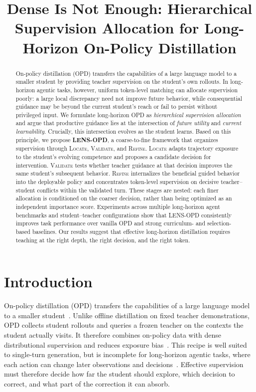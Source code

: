 \documentclass{article}
\title{Dense Is Not Enough: Hierarchical Supervision Allocation for Long-Horizon On-Policy Distillation}
\author{}
\begin{document}
\maketitle

\begin{abstract}
On-policy distillation (OPD) transfers the capabilities of a large language model to a smaller student by providing teacher supervision on the student's own rollouts.  In long-horizon agentic tasks, however, uniform token-level matching can allocate supervision poorly: a large local discrepancy need not improve future behavior, while consequential guidance may be beyond the current student's reach or fail to persist without privileged input.  We formulate long-horizon OPD as \emph{hierarchical supervision allocation} and argue that productive guidance lies at the intersection of \emph{future utility} and \emph{current learnability}.  Crucially, this intersection evolves as the student learns.  Based on this principle, we propose \textbf{LENS-OPD}, a coarse-to-fine framework that organizes supervision through \textsc{Locate}, \textsc{Validate}, and \textsc{Refine}.  \textsc{Locate} adapts trajectory exposure to the student's evolving competence and proposes a candidate decision for intervention.  \textsc{Validate} tests whether teacher guidance at that decision improves the same student's subsequent behavior.  \textsc{Refine} internalizes the beneficial guided behavior into the deployable policy and concentrates token-level supervision on decisive teacher--student conflicts within the validated turn.  These stages are nested: each finer allocation is conditioned on the coarser decision, rather than being optimized as an independent importance score.  Experiments across multiple long-horizon agent benchmarks and student--teacher configurations show that LENS-OPD consistently improves task performance over vanilla OPD and strong curriculum- and selection-based baselines.  Our results suggest that effective long-horizon distillation requires teaching at the right depth, the right decision, and the right token.
\end{abstract}

\section{Introduction}
\label{sec:introduction}

On-policy distillation (OPD) transfers the capabilities of a large language model to a smaller
student~\citep{gu2023minillm,agarwal2024policy}.  Unlike offline distillation on fixed teacher
demonstrations, OPD collects student rollouts and queries a frozen teacher on the contexts the student
actually visits.  It therefore combines on-policy data with dense distributional supervision and
reduces exposure bias~\citep{DBLP:conf/aistats/RossGB11,DBLP:conf/nips/BengioVJS15}.  This recipe is
well suited to single-turn generation, but is incomplete for long-horizon agentic tasks, where each
action can change later observations and decisions~\citep{DBLP:conf/iclr/ShridharYCBTH21,
DBLP:conf/nips/Yao0YN22,DBLP:conf/emnlp/WangJCA22}.  Effective supervision must therefore decide how
far the student should explore, which decision to correct, and what part of the correction it can
absorb.
\end{document}
